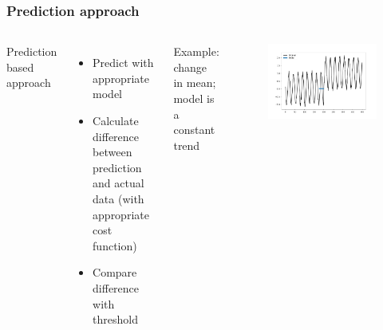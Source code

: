 \documentclass[intlimits, 9pt, unicode]{beamer}
\begin{document}
\begin{frame}
    \frametitle{Prediction approach}
  \begin{columns}[T,onlytextwidth]
	Prediction based approach
	    \begin{itemize}
	    	\item Predict with appropriate model
		\item Calculate difference between prediction and actual data (with appropriate cost function)
		\item Compare difference with threshold
	    \end{itemize}
      Example: change in mean; model is a constant trend
      \begin{figure}
	\includegraphics[scale=0.2]{images/approaches_first_2}
	\end{figure}
     \end{columns}
\end{frame}
\end{document}
